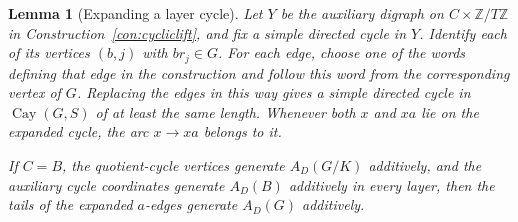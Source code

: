 \documentclass[11pt,a4paper,reqno]{amsart}
\newtheorem{lemma}[theorem]{Lemma}
\theoremstyle{definition}
\theoremstyle{remark}
\numberwithin{equation}{section}
\DeclareMathOperator{\Cay}{Cay}
\newcommand{\Z}{\mathbb Z}
\begin{document}
\begin{lemma}[Expanding a layer cycle]\label{lem:local}
Let $Y$ be the auxiliary digraph on $C\times\Z/T\Z$ in Construction~\ref{con:cycliclift}, and fix a simple directed cycle in $Y$. Identify each of its vertices $(b,j)$ with $br_j\in G$. For each edge, choose one of the words defining that edge in the construction and follow this word from the corresponding vertex of $G$. Replacing the edges in this way gives a simple directed cycle in $\Cay(G,S)$ of at least the same length. Whenever both $x$ and $xa$ lie on the expanded cycle, the arc $x\to xa$ belongs to it.

If $C=B$, the quotient-cycle vertices generate $A_D(G/K)$ additively, and the auxiliary cycle coordinates generate $A_D(B)$ additively in every layer, then the tails of the expanded $a$-edges generate $A_D(G)$ additively.
\end{lemma}
\end{document}
